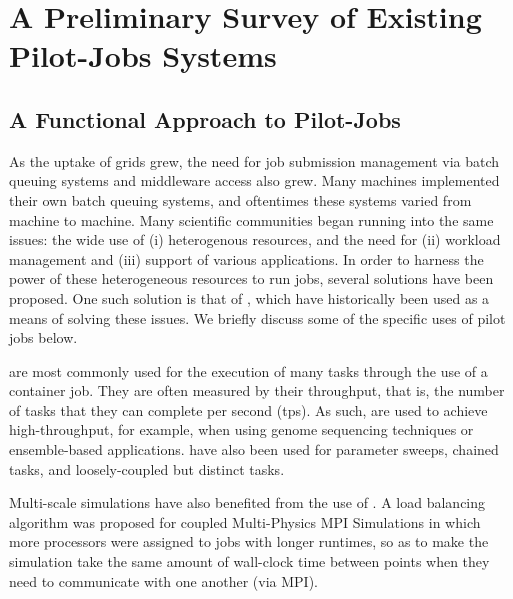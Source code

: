 \documentclass{sig-alternate}
\begin{document}

\section{A Preliminary Survey of Existing Pilot-Jobs Systems}
\label{sec:survey}


\subsection{A Functional Approach to Pilot-Jobs}

As the uptake of grids grew, the need for job submission management
via batch queuing systems and middleware access also grew. Many
machines implemented their own batch queuing systems, and oftentimes
these systems varied from machine to machine. Many scientific
communities began running into the same issues: the wide use of (i) heterogenous
resources, and the need for (ii) workload management and (iii) support of various
applications. In order to harness the power of these
heterogeneous resources to run jobs, several solutions have been proposed. 
One such solution is that of \pilotjobs, which have historically been
used as a means of solving these issues. We briefly discuss some of
the specific uses of pilot jobs below.

\pilotjobs are most commonly used for the execution of many tasks
through the use of a container job. They are often measured by
their throughput, that is, the number of tasks that they can complete
per second (tps). As such, \pilotjobs are used to achieve
high-throughput, for example, when using genome sequencing techniques
or ensemble-based applications. \pilotjobs have also been used for
parameter sweeps, chained tasks, and loosely-coupled but distinct
tasks. %

Multi-scale simulations have also benefited from the use of
\pilotjobs. A \pilotjob load balancing algorithm was proposed for
coupled Multi-Physics MPI Simulations \cite{ko-efficient} in which
more processors were assigned to jobs with longer runtimes, so as to
make the simulation take the same amount of wall-clock time between
points when they need to communicate with one another (via MPI).
\end{document}

